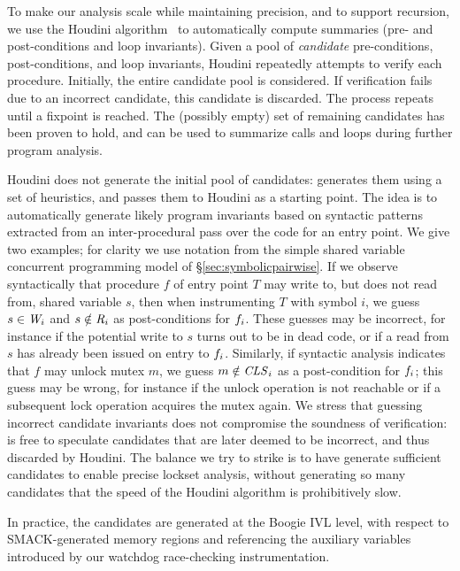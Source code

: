 To make our analysis scale while maintaining precision, and to support recursion, we use the Houdini algorithm~\cite{flanagan2001houdini} to automatically compute summaries (pre- and post-conditions and loop invariants).  Given a pool of \emph{candidate} pre-conditions, post-conditions, and loop invariants, Houdini repeatedly attempts to verify each procedure.  Initially, the entire candidate pool is considered.  If verification fails due to an incorrect candidate, this candidate is discarded.  The process repeats until a fixpoint is reached.  The (possibly empty) set of remaining candidates has been proven to hold, and can be used to summarize calls and loops during further program analysis.

Houdini does not generate the initial pool of candidates: \whoop generates them using a set of heuristics, and passes them to Houdini as a starting point.  The idea is to automatically generate likely program invariants based on syntactic patterns extracted from an inter-procedural pass over the code for an entry point.  We give two examples; for clarity we use notation from the simple shared variable concurrent programming model of \S\ref{sec:symbolicpairwise}.  If we observe syntactically that procedure $f$ of entry point $T$ may write to, but does not read from, shared variable $s$, then when instrumenting $T$ with symbol $i$, we guess $s \in \mathit{W}_{i}$ and $s \notin\mathit{R}_{i}$ as post-conditions for $f_{i}$.  These guesses may be incorrect, for instance if the potential write to $s$ turns out to be in dead code, or if a read from $s$ has already been issued on entry to $f_{i}$.  Similarly, if syntactic analysis indicates that $f$ may unlock mutex $m$, we guess $m \notin \mathit{CLS}_{i}$ as a post-condition for $f_{i}$; this guess may be wrong, for instance if the unlock operation is not reachable or if a subsequent lock operation acquires the mutex again.  We stress that guessing incorrect candidate invariants does not compromise the soundness of verification: \whoop is free to speculate candidates that are later deemed to be incorrect, and thus discarded by Houdini.  The balance we try to strike is to have \whoop generate sufficient candidates to enable precise lockset analysis, without generating so many candidates that the speed of the Houdini algorithm is prohibitively slow.

In practice, the candidates are generated at the Boogie IVL level, with respect to SMACK-generated memory regions and referencing the auxiliary variables introduced by our watchdog race-checking instrumentation.

